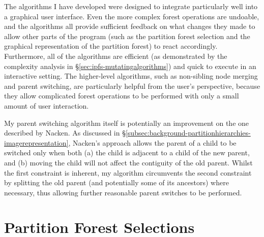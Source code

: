The algorithms I have developed were designed to integrate particularly well into a graphical user interface. Even the more complex forest operations are undoable, and the algorithms all provide sufficient feedback on what changes they made to allow other parts of the program (such as the partition forest selection and the graphical representation of the partition forest) to react accordingly. Furthermore, all of the algorithms are efficient (as demonstrated by the complexity analysis in \S\ref{sec:ipfs-mutatingalgorithms}) and quick to execute in an interactive setting. The higher-level algorithms, such as non-sibling node merging and parent switching, are particularly helpful from the user's perspective, because they allow complicated forest operations to be performed with only a small amount of user interaction.

My parent switching algorithm itself is potentially an improvement on the one described by Nacken. As discussed in \S\ref{subsec:background-partitionhierarchies-imagerepresentation}, Nacken's approach allows the parent of a child to be switched only when both (a) the child is adjacent to a child of the new parent, and (b) moving the child will not affect the contiguity of the old parent. Whilst the first constraint is inherent, my algorithm circumvents the second constraint by splitting the old parent (and potentially some of its ancestors) where necessary, thus allowing further reasonable parent switches to be performed.

\section{Partition Forest Selections}

